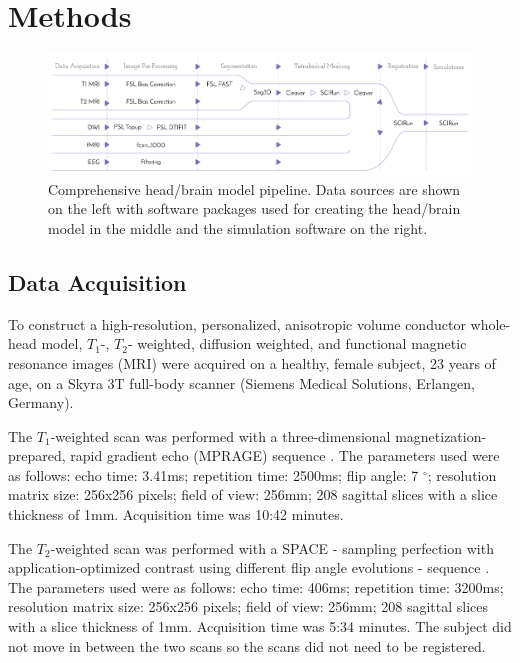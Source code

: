 
\section{Methods}
\label{sec:Methods}

\begin{figure}[H]
    \centering
    \includegraphics[width=\textwidth]{Figures/pipeline}
    \caption{Comprehensive head/brain model pipeline. Data sources are shown on the left with software packages used for creating the head/brain model in the middle and the simulation software on the right.}
    \label{fig:pipeline}
\end{figure}

\subsection{Data Acquisition}
\label{sec:Data}


To construct a high-resolution, personalized, anisotropic volume conductor whole-head model, $T_1$-, $T_2$- weighted, diffusion weighted, and functional magnetic resonance images (MRI) were acquired on a healthy, female subject, 23 years of age, on a Skyra 3T full-body scanner (Siemens Medical Solutions, Erlangen, Germany).

The $T_1$-weighted scan was performed with a three-dimensional magnetization-prepared, rapid gradient echo (MPRAGE) sequence \cite{ref:mprage}. The parameters used were as follows: echo time: 3.41ms; repetition time: 2500ms; flip angle: 7 $^{\circ}$; resolution matrix size: 256x256 pixels; field of view: 256mm; 208 sagittal slices with a slice thickness of 1mm. Acquisition time was 10:42 minutes.

The $T_2$-weighted scan was performed with a SPACE - sampling perfection with application-optimized contrast using different flip angle evolutions - sequence \cite{ref:space}. The parameters used were as follows: echo time: 406ms; repetition time: 3200ms; resolution matrix size: 256x256 pixels; field of view: 256mm; 208 sagittal slices with a slice thickness of 1mm. Acquisition time was 5:34 minutes. The subject did not move in between the two scans so the scans did not need to be registered.

